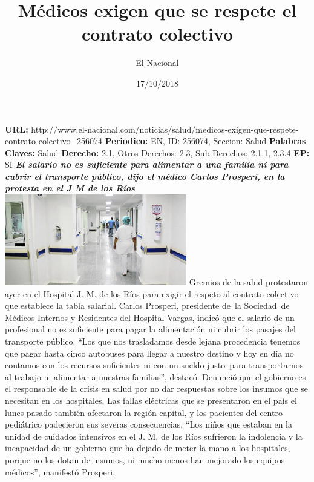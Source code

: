 \documentclass{article}%
\title{\textbf{Médicos exigen que se respete el contrato colectivo}}%
\author{El Nacional}%
\date{17/10/2018}%
\begin{document}
%
\normalsize%
\maketitle%
\textbf{URL: }%
http://www.el{-}nacional.com/noticias/salud/medicos{-}exigen{-}que{-}respete{-}contrato{-}colectivo\_256074\newline%
%
\textbf{Periodico: }%
EN, %
ID: %
256074, %
Seccion: %
Salud\newline%
%
\textbf{Palabras Claves: }%
Salud\newline%
%
\textbf{Derecho: }%
2.1, %
Otros Derechos: %
2.3, %
Sub Derechos: %
2.1.1, 2.3.4\newline%
%
\textbf{EP: }%
SI\newline%
\newline%
%
\textbf{\textit{El salario no es suficiente para alimentar a una familia ni para cubrir el transporte público, dijo el médico Carlos Prosperi, en la protesta en el J M de los Ríos}}%
\newline%
\newline%
%
\includegraphics[width=300px]{19.jpg}%
\newline%
%
Gremios de la salud protestaron ayer en el Hospital J. M. de los Ríos para exigir el respeto al contrato colectivo que establece la tabla salarial.%
\newline%
%
Carlos Prosperi, presidente de~la Sociedad~de Médicos Internos y Residentes del Hospital Vargas, indicó que el salario de un profesional no es suficiente para pagar la alimentación ni cubrir los pasajes del transporte público. “Los que nos trasladamos desde lejana procedencia tenemos que pagar hasta cinco autobuses para llegar a nuestro destino y hoy en día no contamos con los recursos suficientes ni con un sueldo justo~para transportarnos al trabajo ni alimentar a nuestras familias”, destacó.%
\newline%
%
Denunció que el gobierno es el responsable de la crisis en salud por no dar respuestas sobre los insumos que se necesitan en los hospitales.%
\newline%
%
Las fallas eléctricas que se presentaron en el país el lunes pasado también afectaron la región capital, y los pacientes del centro pediátrico padecieron sus severas consecuencias. “Los niños que estaban en la unidad de cuidados intensivos en el J. M. de los Ríos sufrieron la indolencia y la incapacidad de un gobierno que ha dejado de meter la mano a los hospitales, porque no los dotan de insumos, ni mucho menos han mejorado los equipos médicos”, manifestó Prosperi.%
\end{document}
